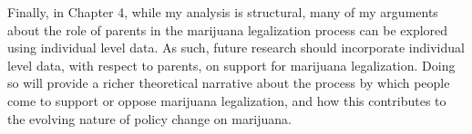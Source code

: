 Finally, in Chapter 4, while my analysis is structural, many of my arguments about the role of parents in the marijuana legalization process can be explored using individual level data. As such, future research should incorporate individual level data, with respect to parents, on support for marijuana legalization. Doing so will provide a richer theoretical narrative about the process by which people come to support or oppose marijuana legalization, and how this contributes to the evolving nature of policy change on marijuana. 


